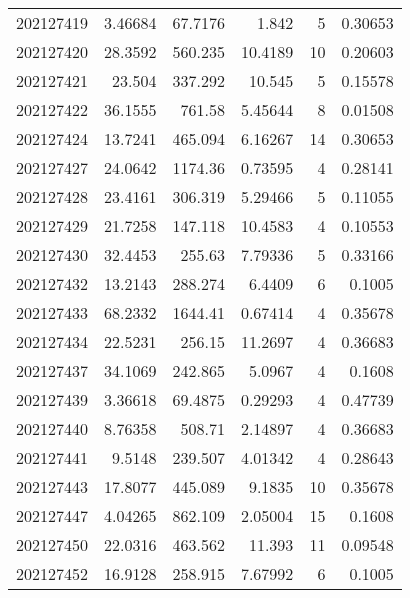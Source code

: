 \begin{tabular}{rrrrrr}
 202127419 &          3.46684 &       67.7176 &            1.842   &           5 & 0.30653 \\
 202127420 &         28.3592  &      560.235  &           10.4189  &          10 & 0.20603 \\
 202127421 &         23.504   &      337.292  &           10.545   &           5 & 0.15578 \\
 202127422 &         36.1555  &      761.58   &            5.45644 &           8 & 0.01508 \\
 202127424 &         13.7241  &      465.094  &            6.16267 &          14 & 0.30653 \\
 202127427 &         24.0642  &     1174.36   &            0.73595 &           4 & 0.28141 \\
 202127428 &         23.4161  &      306.319  &            5.29466 &           5 & 0.11055 \\
 202127429 &         21.7258  &      147.118  &           10.4583  &           4 & 0.10553 \\
 202127430 &         32.4453  &      255.63   &            7.79336 &           5 & 0.33166 \\
 202127432 &         13.2143  &      288.274  &            6.4409  &           6 & 0.1005  \\
 202127433 &         68.2332  &     1644.41   &            0.67414 &           4 & 0.35678 \\
 202127434 &         22.5231  &      256.15   &           11.2697  &           4 & 0.36683 \\
 202127437 &         34.1069  &      242.865  &            5.0967  &           4 & 0.1608  \\
 202127439 &          3.36618 &       69.4875 &            0.29293 &           4 & 0.47739 \\
 202127440 &          8.76358 &      508.71   &            2.14897 &           4 & 0.36683 \\
 202127441 &          9.5148  &      239.507  &            4.01342 &           4 & 0.28643 \\
 202127443 &         17.8077  &      445.089  &            9.1835  &          10 & 0.35678 \\
 202127447 &          4.04265 &      862.109  &            2.05004 &          15 & 0.1608  \\
 202127450 &         22.0316  &      463.562  &           11.393   &          11 & 0.09548 \\
 202127452 &         16.9128  &      258.915  &            7.67992 &           6 & 0.1005  \\

\end{tabular}
